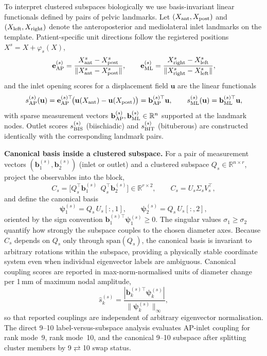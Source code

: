 \documentclass[11pt]{article}
\begin{document}
To interpret clustered subspaces biologically we use basis-invariant linear functionals defined by pairs of pelvic landmarks.
Let $(X_{\rm ant},X_{\rm post})$ and $(X_{\rm left},X_{\rm right})$ denote the anteroposterior and mediolateral inlet landmarks on the template.
Patient-specific unit directions follow the registered positions $X^s=X+\varphi_s(X)$,
\begin{equation}
\mathbf e_{\rm AP}^{(s)}=\frac{X_{\rm ant}^s-X_{\rm post}^s}{\|X_{\rm ant}^s-X_{\rm post}^s\|},\qquad
\mathbf e_{\rm ML}^{(s)}=\frac{X_{\rm right}^s-X_{\rm left}^s}{\|X_{\rm right}^s-X_{\rm left}^s\|},
\end{equation}
and the inlet opening scores for a displacement field $\mathbf u$ are the linear functionals
\begin{equation}
s_{\rm AP}^{(s)}(\mathbf u)=\mathbf e_{\rm AP}^{(s)\top}\!\big(\mathbf u(X_{\rm ant})-\mathbf u(X_{\rm post})\big)=\mathbf b_{\rm AP}^{(s)\top}\mathbf u,\qquad
s_{\rm ML}^{(s)}(\mathbf u)=\mathbf b_{\rm ML}^{(s)\top}\mathbf u,
\label{eq:inlet-scores}
\end{equation}
with sparse measurement vectors $\mathbf b_{\rm AP}^{(s)},\mathbf b_{\rm ML}^{(s)}\in\mathbb R^n$ supported at the landmark nodes.
Outlet scores $s_{\rm BIS}^{(s)}$ (biischiadic) and $s_{\rm BIT}^{(s)}$ (bituberous) are constructed identically with the corresponding landmark pairs.

\noindent\textbf{Canonical basis inside a clustered subspace.}
For a pair of measurement vectors $(\mathbf b_1^{(s)},\mathbf b_2^{(s)})$ (inlet or outlet) and a clustered subspace $Q_s\in\mathbb R^{n\times r}$, project the observables into the block,
\begin{equation}
C_s=\big[Q_s^\top\mathbf b_1^{(s)}\ \ Q_s^\top\mathbf b_2^{(s)}\big]\in\mathbb R^{r\times 2},\qquad C_s=U_s\Sigma_s V_s^\top,
\label{eq:canonical-proj}
\end{equation}
and define the canonical basis
\begin{equation}
\boldsymbol\psi_1^{(s)}=Q_s\,U_s[:,1],\qquad
\boldsymbol\psi_2^{(s)}=Q_s\,U_s[:,2],
\label{eq:canonical-basis}
\end{equation}
oriented by the sign convention $\mathbf b_1^{(s)\top}\boldsymbol\psi_1^{(s)}\ge 0$.
The singular values $\sigma_1\ge\sigma_2$ quantify how strongly the subspace couples to the chosen diameter axes.
Because $C_s$ depends on $Q_s$ only through $\mathrm{span}(Q_s)$, the canonical basis is invariant to arbitrary rotations within the subspace, providing a physically stable coordinate system even when individual eigenvector labels are ambiguous.
Canonical coupling scores are reported in max-norm-normalised units of diameter change per 1\,mm of maximum nodal amplitude,
\begin{equation}
\widehat s^{(s)}_k=\frac{|\mathbf b_k^{(s)\top}\boldsymbol\psi_k^{(s)}|}{\|\boldsymbol\psi_k^{(s)}\|_\infty},
\end{equation}
so that reported couplings are independent of arbitrary eigenvector normalisation.
The direct 9--10 label-versus-subspace analysis evaluates AP-inlet coupling for rank mode~9, rank mode~10, and the canonical 9--10 subspace after splitting cluster members by 9$\rightleftarrows$10 swap status.
\end{document}
